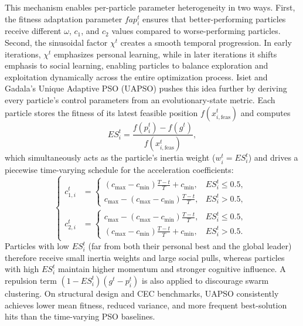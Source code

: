 \documentclass[fleqn,10pt]{wlscirep}
\begin{document}
This mechanism enables per-particle parameter heterogeneity in two ways.
First, the fitness adaptation parameter $fap_i^{t}$ ensures that better-performing particles receive different $\omega$, $c_1$, and $c_2$ values compared to worse-performing particles.
Second, the sinusoidal factor $\chi^{t}$ creates a smooth temporal progression.
In early iterations, $\chi^{t}$ emphasizes personal learning, while in later iterations it shifts emphasis to social learning, enabling particles to balance exploration and exploitation dynamically across the entire optimization process.
Isiet and Gadala's Unique Adaptive PSO (UAPSO) \cite{Isiet2019UAPSO} pushes this idea further by deriving every particle's control parameters from an evolutionary-state metric.
Each particle stores the fitness of its latest feasible position $f(x^{t}_{i,\mathrm{feas}})$ and computes
\begin{equation}
ES_i^{t} = \frac{f(p_i^{t}) - f(g^{t})}{f(x^{t}_{i,\mathrm{feas}})},
\end{equation}
which simultaneously acts as the particle's inertia weight ($w_i^{t}=ES_i^{t}$) and drives a piecewise time-varying schedule for the acceleration coefficients:
\begin{equation}
\left\{
\begin{aligned}
    c_{1,i}^{t} &=
        \begin{cases}
            (c_{\max}-c_{\min})\frac{T-t}{T} + c_{\min}, & ES_i^{t} \le 0.5,\\
            c_{\max} - (c_{\max}-c_{\min})\frac{T-t}{T}, & ES_i^{t} > 0.5,
        \end{cases} \\[6pt]
    c_{2,i}^{t} &=
        \begin{cases}
            c_{\max} - (c_{\max}-c_{\min})\frac{T-t}{T}, & ES_i^{t} \le 0.5,\\
            (c_{\max}-c_{\min})\frac{T-t}{T} + c_{\min}, & ES_i^{t} > 0.5.
        \end{cases}
\end{aligned}
\right.
\end{equation}
Particles with low $ES_i^{t}$ (far from both their personal best and the global leader) therefore receive small inertia weights and large social pulls, whereas particles with high $ES_i^{t}$ maintain higher momentum and stronger cognitive influence.
A repulsion term $(1-ES_i^{t})(g^{t}-p_i^{t})$ is also applied to discourage swarm clustering.
On structural design and CEC benchmarks, UAPSO consistently achieves lower mean fitness, reduced variance, and more frequent best-solution hits than the time-varying PSO baselines.
\end{document}
